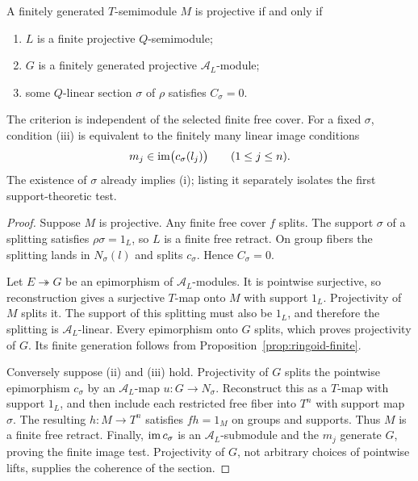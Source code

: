 \begin{theorem}\label{thm:ringoid-projective}
A finitely generated $T$-semimodule $M$ is projective if and only if
\begin{enumerate}
 \item[\textup{(i)}] $L$ is a finite projective $Q$-semimodule;
 \item[\textup{(ii)}] $G$ is a finitely generated projective $\mathcal A_L$-module;
 \item[\textup{(iii)}] some $Q$-linear section $\sigma$ of $\rho$ satisfies $C_\sigma=0$.
\end{enumerate}
The criterion is independent of the selected finite free cover. For a
fixed $\sigma$, condition \textup{(iii)} is equivalent to the finitely
many linear image conditions
\[
 m_j\in\operatorname{im}\bigl(c_\sigma(l_j)\bigr)\qquad(1\leq j\leq n).
\]
The existence of $\sigma$ already implies \textup{(i)}; listing it
separately isolates the first support-theoretic test.
\end{theorem}
\begin{proof}
Suppose $M$ is projective. Any finite free cover $f$ splits. The support
$\sigma$ of a splitting satisfies $\rho\sigma=1_L$, so $L$ is a
finite free retract. On group fibers the splitting lands in
$N_\sigma(l)$ and splits $c_\sigma$. Hence $C_\sigma=0$.

Let $E\twoheadrightarrow G$ be an epimorphism of $\mathcal A_L$-modules.
It is pointwise surjective, so reconstruction gives a surjective
$T$-map onto $M$ with support $1_L$. Projectivity of $M$ splits it.
The support of this splitting must also be $1_L$, and therefore the
splitting is $\mathcal A_L$-linear. Every epimorphism onto $G$ splits,
which proves projectivity of $G$. Its finite generation follows from
Proposition~\ref{prop:ringoid-finite}.

Conversely suppose \textup{(ii)} and \textup{(iii)} hold.
Projectivity of $G$ splits the pointwise epimorphism $c_\sigma$ by an
$\mathcal A_L$-map $u:G\to N_\sigma$. Reconstruct this as a $T$-map
with support $1_L$, and then include each restricted free fiber into
$T^n$ with support map $\sigma$. The resulting $h:M\to T^n$
satisfies $fh=1_M$ on groups and supports. Thus $M$ is a finite free
retract. Finally, $\operatorname{im} c_\sigma$ is an $\mathcal A_L$-submodule and
the $m_j$ generate $G$, proving the finite image test. Projectivity of
$G$, not arbitrary choices of pointwise lifts, supplies the coherence
of the section.
\end{proof}

